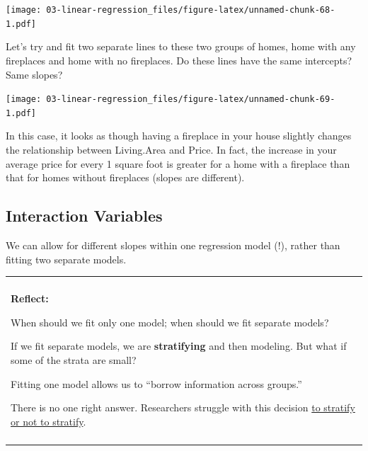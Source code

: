 \documentclass[
]{book}
\newenvironment{Shaded}{\begin{snugshade}}{\end{snugshade}}
\newcommand{\DataTypeTok}[1]{\textcolor[rgb]{0.13,0.29,0.53}{#1}}
\newcommand{\KeywordTok}[1]{\textcolor[rgb]{0.13,0.29,0.53}{\textbf{#1}}}
\newcommand{\NormalTok}[1]{#1}
\newcommand{\OperatorTok}[1]{\textcolor[rgb]{0.81,0.36,0.00}{\textbf{#1}}}
\newcommand{\OtherTok}[1]{\textcolor[rgb]{0.56,0.35,0.01}{#1}}
\newcommand{\StringTok}[1]{\textcolor[rgb]{0.31,0.60,0.02}{#1}}
\newenvironment{reflect}
{
    \begin{center}
    
    \begin{tabular}{|p{0.8\textwidth}|}
    \rowcolor{LightBlue}
    \hline\\
    \rowcolor{LightBlue}
    \textbf{Reflect:}
}
{
    \\\rowcolor{LightBlue}
    \\\hline
    \end{tabular} 
    \end{center}
}
\begin{document}
\texttt{[image: 03-linear-regression\_files/figure-latex/unnamed-chunk-68-1.pdf]}

Let's try and fit two separate lines to these two groups of homes, home with any fireplaces and home with no fireplaces. Do these lines have the same intercepts? Same slopes?

\begin{Shaded}
\end{Shaded}

\texttt{[image: 03-linear-regression\_files/figure-latex/unnamed-chunk-69-1.pdf]}

In this case, it looks as though having a fireplace in your house slightly changes the relationship between Living.Area and Price. In fact, the increase in your average price for every 1 square foot is greater for a home with a fireplace than that for homes without fireplaces (slopes are different).

\hypertarget{interaction-variables}{%
\subsection{Interaction Variables}\label{interaction-variables}}

We can allow for different slopes within one regression model (!), rather than fitting two separate models.

\begin{reflect}
When should we fit only one model; when should we fit separate models?

If we fit separate models, we are \textbf{stratifying} and then
modeling. But what if some of the strata are small?

Fitting one model allows us to ``borrow information across groups.''

There is no one right answer. Researchers struggle with this decision
\href{https://www.ncbi.nlm.nih.gov/pubmed/22125224}{to stratify or not
to stratify}.
\end{reflect}
\end{document}
